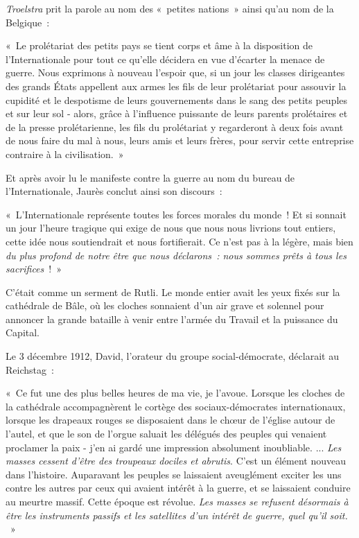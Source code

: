 \documentclass[french,twoside]{book} %
\newenvironment{quoteblock}%
  {\begin{quoting}}
  {\end{quoting}}
\newenvironment{quotebar}{%
    \def\FrameCommand{{\color{rubric!10!}\vrule width 0.5em} \hspace{0.9em}}%
    \def\OuterFrameSep{\itemsep} %
    \MakeFramed {\advance\hsize-\width \FrameRestore}
  }%
  {%
    \endMakeFramed
  }
\renewenvironment{quoteblock}%
  {%
    \savenotes
    \setstretch{0.9}
    \normalfont
    \begin{quotebar}
  }
  {%
    \end{quotebar}
    \spewnotes
  }
\begin{document}
\noindent \emph{Troelstra} prit la parole au nom des « petites nations » ainsi qu’au nom de la Belgique :\par

\begin{quoteblock}
 \noindent « Le prolétariat des petits pays se tient corps et âme à la disposition de l’Internationale pour tout ce qu’elle décidera en vue d’écarter la menace de guerre. Nous exprimons à nouveau l’espoir que, si un jour les classes dirigeantes des grands États appellent aux armes les fils de leur prolétariat pour assouvir la cupidité et le despotisme de leurs gouvernements dans le sang des petits peuples et sur leur sol - alors, grâce à l’influence puissante de leurs parents prolétaires et de la presse prolétarienne, les fils du prolétariat y regarderont à deux fois avant de nous faire du mal à nous, leurs amis et leurs frères, pour servir cette entreprise contraire à la civilisation. »
\end{quoteblock}

\noindent Et après avoir lu le manifeste contre la guerre au nom du bureau de l’Internationale, Jaurès conclut ainsi son discours :\par

\begin{quoteblock}
 \noindent « L'Internationale représente toutes les forces morales du monde ! Et si sonnait un jour l’heure tragique qui exige de nous que nous nous livrions tout entiers, cette idée nous soutiendrait et nous fortifierait. Ce n’est pas à la légère, mais bien \emph{du plus profond de notre être que nous déclarons : nous sommes prêts à tous les sacrifices} ! »
\end{quoteblock}

\noindent   C'était comme un serment de Rutli. Le monde entier avait les yeux fixés sur la cathédrale de Bâle, où les cloches sonnaient d’un air grave et solennel pour annoncer la grande bataille à venir entre l’armée du Travail et la puissance du Capital.\par
Le 3 décembre 1912, David, l’orateur du groupe social-démocrate, déclarait au Reichstag :\par

\begin{quoteblock}
 \noindent « Ce fut une des plus belles heures de ma vie, je l’avoue. Lorsque les cloches de la cathédrale accompagnèrent le cortège des sociaux-démocrates internationaux, lorsque les drapeaux rouges se disposaient dans le chœur de l’église autour de l’autel, et que le son de l’orgue saluait les délégués des peuples qui venaient proclamer la paix - j’en ai gardé une impression absolument inoubliable. ... \emph{Les masses cessent d’être des troupeaux dociles et abrutis}. C'est un élément nouveau dans l’histoire. Auparavant les peuples se laissaient aveuglément exciter les uns contre les autres par ceux qui avaient intérêt à la guerre, et se laissaient conduire au meurtre massif. Cette époque est révolue. \emph{Les masses se refusent désormais à être les instruments passifs et les satellites d’un intérêt de guerre, quel qu’il soit.}  »
\end{quoteblock}
\end{document}
